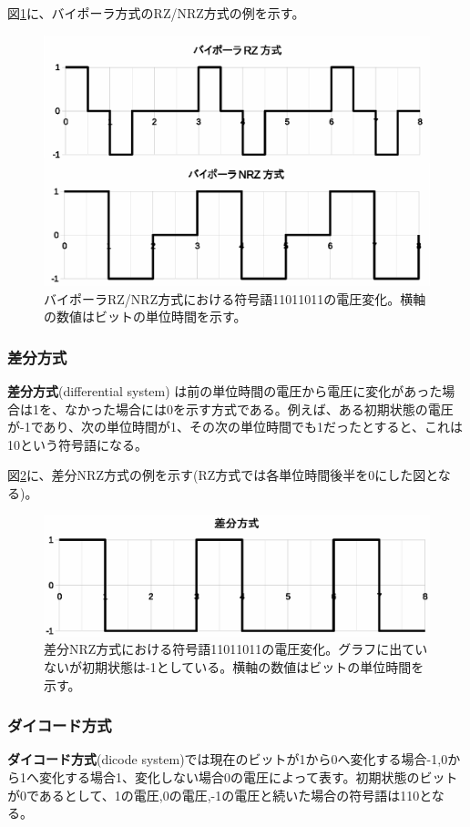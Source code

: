 図\ref{fig5_2}に、バイポーラ方式のRZ/NRZ方式の例を示す。
\begin{figure}[htbp]
\centering
\includegraphics[width=0.8\linewidth,keepaspectratio]{fig/fig5_2.eps}
\caption{バイポーラRZ/NRZ方式における符号語11011011の電圧変化。横軸の数値はビットの単位時間を示す。}
\label{fig5_2}
\end{figure}


\subsubsection{差分方式} 
\textbf{差分方式}(differential system) は前の単位時間の電圧から電圧に変化があった場合は1を、なかった場合には0を示す方式である。例えば、ある初期状態の電圧が-1であり、次の単位時間が1、その次の単位時間でも1だったとすると、これは10という符号語になる。

図\ref{fig5_3}に、差分NRZ方式の例を示す(RZ方式では各単位時間後半を0にした図となる)。
\begin{figure}[htbp]
\centering
\includegraphics[width=0.8\linewidth,keepaspectratio]{fig/fig5_3.eps}
\caption{差分NRZ方式における符号語11011011の電圧変化。グラフに出ていないが初期状態は-1としている。横軸の数値はビットの単位時間を示す。}
\label{fig5_3}
\end{figure}


\subsubsection{ダイコード方式} 
\textbf{ダイコード方式}(dicode system)では現在のビットが1から0へ変化する場合-1,0から1へ変化する場合1、変化しない場合0の電圧によって表す。初期状態のビットが0であるとして、1の電圧,0の電圧,-1の電圧と続いた場合の符号語は110となる。

